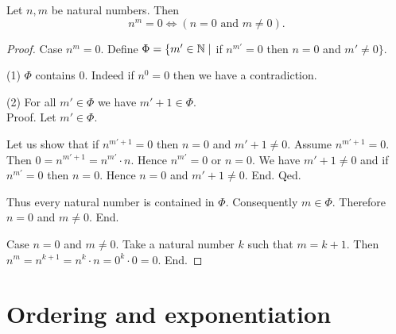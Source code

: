 \documentclass[../arithmetic.tex]{subfiles}
\begin{document}
  \begin{forthel}
    \begin{proposition}
      Let $n, m$ be natural numbers.
      Then \[ n^{m} = 0 \iff (\text{$n = 0$ and $m \neq 0$}). \]
    \end{proposition}
    \begin{proof}
      Case $n^{m} = 0$.
        Define $\Phi = \{ m' \in \mathbb{N} \mid$ if $n^{m'} = 0$ then $n = 0$ and
        $m' \neq 0 \}$.

        (1) $\Phi$ contains $0$.
        Indeed if $n^{0} = 0$ then we have a contradiction.

        (2) For all $m' \in \Phi$ we have $m' + 1 \in \Phi$. \\
        Proof.
          Let $m' \in \Phi$.

          Let us show that if $n^{m' + 1} = 0$ then $n = 0$ and $m' + 1 \neq 0$.
            Assume $n^{m' + 1} = 0$.
            Then $0 = n^{m' + 1} = n^{m'} \cdot n$.
            Hence $n^{m'} = 0$ or $n = 0$.
            We have $m' + 1 \neq 0$ and if $n^{m'} = 0$ then $n = 0$.
            Hence $n = 0$ and $m' + 1 \neq 0$.
          End.
        Qed.

        Thus every natural number is contained in $\Phi$.
        Consequently $m \in \Phi$.
        Therefore $n = 0$ and $m \neq 0$.
      End.

      Case $n = 0$ and $m \neq 0$.
        Take a natural number $k$ such that $m = k + 1$.
        Then $n^{m}
          = n^{k + 1}
          = n^{k} \cdot n
          = 0^{k} \cdot 0
          = 0$.
      End.
    \end{proof}
  \end{forthel}


  \section{Ordering and exponentiation}
\end{document}
